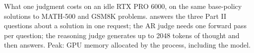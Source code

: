 \begin{table}[t]
\centering\small

\caption{What one judgment costs on an idle RTX PRO 6000, on the same  base-policy solutions to
MATH-500 and GSM8K problems. \kev{} answers the three Part II questions about a solution in one request; the AR judge
needs one forward pass per question; the reasoning judge generates up to 2048 tokens of thought and then answers.
Peak: GPU memory allocated by the process, including the model.}
\label{tab:judge-cost}
\end{table}
